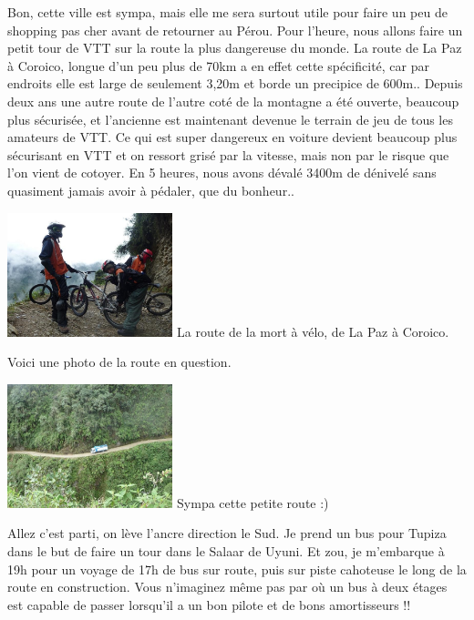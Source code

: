 \begin{multicols}{2}
Bon, cette ville est sympa, mais elle me sera surtout utile pour faire un peu de shopping pas cher avant de retourner au Pérou. Pour l'heure, nous allons faire un petit tour de VTT sur la route la plus dangereuse du monde. La route de La Paz à Coroico, longue d'un peu plus de 70km a en effet cette spécificité, car par endroits elle est large de seulement 3,20m et borde un precipice de 600m.. Depuis deux ans une autre route de l'autre coté de la montagne a été ouverte, beaucoup plus sécurisée, et l'ancienne est maintenant devenue le terrain de jeu de tous les amateurs de VTT. Ce qui est super dangereux en voiture devient beaucoup plus sécurisant en VTT et on ressort grisé par la vitesse, mais non par le risque que l'on vient de cotoyer. En 5 heures, nous avons dévalé 3400m de dénivelé sans quasiment jamais avoir à pédaler, que du bonheur..

\hspace*{-0.65cm}
\includegraphics[width=4.8cm]{articles/La-paz-humahuaca-et-salaar/1257387311RBTU.jpg}
La route de la mort à vélo, de La Paz à Coroico.

Voici une photo de la route en question.

\hspace*{-0.65cm}
\includegraphics[width=4.8cm]{articles/La-paz-humahuaca-et-salaar/1257387218mz18.jpg}
Sympa cette petite route :)

Allez c'est parti, on lève l'ancre direction le Sud. Je prend un bus pour Tupiza dans le but de faire un tour dans le Salaar de Uyuni. Et zou, je m'embarque à 19h pour un voyage de 17h de bus sur route, puis sur piste cahoteuse le long de la route en construction. Vous n'imaginez même pas par où un bus à deux étages est capable de passer lorsqu'il a un bon pilote et de bons amortisseurs !!


\end{multicols}
